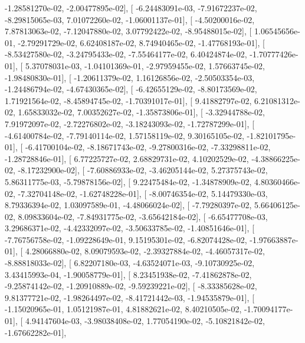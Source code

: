 \documentclass{article}
\begin{document}
         -1.28581270e-02,  -2.00477895e-02],
       [ -6.24483091e-03,  -7.91672237e-02,  -8.29815065e-03,
          7.01072260e-02,  -1.06001137e-01],
       [ -4.50200016e-02,   7.87813063e-02,  -7.12047880e-02,
          3.07792422e-02,  -8.95488015e-02],
       [  1.06545656e-01,  -2.79291729e-02,   6.62408187e-02,
          8.74940465e-02,  -1.47768193e-01],
       [ -8.53427580e-02,  -3.24795433e-02,  -7.55464177e-02,
          6.40424874e-02,  -1.70777426e-01],
       [  5.37078031e-03,  -1.04101369e-01,  -2.97959455e-02,
          1.57663745e-02,  -1.98480830e-01],
       [ -1.20611379e-02,   1.16126856e-02,  -2.50503354e-03,
         -1.24486794e-02,  -4.67430365e-02],
       [ -6.42655129e-02,  -8.80173569e-02,   1.71921564e-02,
         -8.45894745e-02,  -1.70391017e-01],
       [  9.41882797e-02,   6.21081312e-02,   1.65833032e-02,
          7.00352627e-02,  -1.35873806e-01],
       [ -3.32944788e-02,   7.91972097e-02,  -2.72276802e-02,
         -3.18243093e-02,  -1.72787299e-01],
       [ -4.61400784e-02,  -7.79140114e-02,   1.57158119e-02,
          9.30165105e-02,  -1.82101795e-01],
       [ -6.41700104e-02,  -8.18671743e-02,  -9.27800316e-02,
         -7.33298811e-02,  -1.28728846e-01],
       [  6.77225727e-02,   2.68829731e-02,   4.10202529e-02,
         -4.38866225e-02,  -8.17232900e-02],
       [ -7.60886933e-02,  -3.46205144e-02,   5.27375743e-02,
          5.86311775e-03,  -5.79878156e-02],
       [  9.22475484e-02,  -1.34878909e-02,   4.80360466e-02,
         -7.32704148e-02,  -1.62748228e-01],
       [ -8.00746354e-02,   5.14479330e-03,   8.79336394e-02,
          1.03097589e-01,  -4.48066024e-02],
       [ -7.79280397e-02,   5.66406125e-02,   8.09833604e-02,
         -7.84931775e-02,  -3.65642184e-02],
       [ -6.65477708e-03,   3.29686371e-02,  -4.42332097e-02,
         -3.50633785e-02,  -1.40851646e-01],
       [ -7.76756758e-02,  -1.09228649e-01,   9.15195301e-02,
         -6.82074428e-02,  -1.97663887e-01],
       [  4.28066880e-02,   8.09079593e-02,  -2.39327884e-02,
         -4.46057317e-02,  -8.88818033e-02],
       [  6.82207180e-03,  -4.63524071e-03,  -9.10730925e-02,
          3.43415993e-04,  -1.90058779e-01],
       [  8.23451938e-02,  -7.41862878e-02,  -9.25874142e-02,
         -1.20910889e-02,  -9.59239221e-02],
       [ -8.33385628e-02,   9.81377721e-02,  -1.98264497e-02,
         -8.41721442e-03,  -1.94535879e-01],
       [ -1.15020965e-01,   1.05121987e-01,   4.81882621e-02,
          8.40210505e-02,  -1.70094177e-01],
       [  4.94147604e-03,  -3.98038408e-02,   1.77054190e-02,
         -5.10821842e-02,  -1.67662282e-01],
\end{document}
